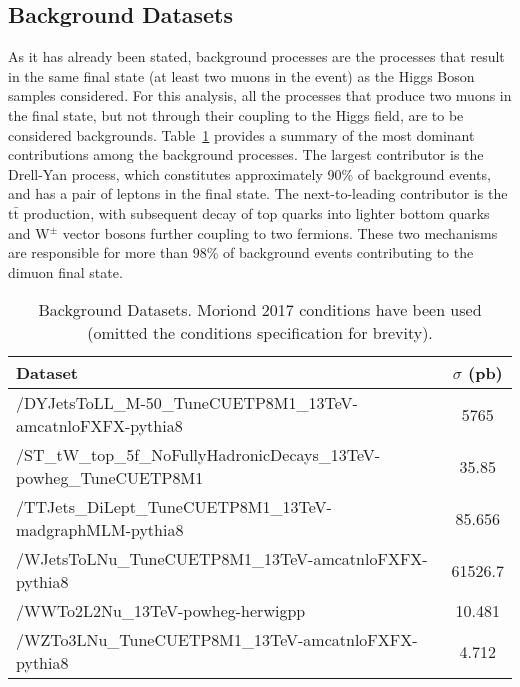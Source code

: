 \subsection{Background Datasets}
As it has already been stated, background processes are the processes that result in the same final state (at least two muons in the event) as the Higgs Boson samples considered. For this analysis, all the processes that produce two muons in the final state, but not through their coupling to the Higgs field,  are to be considered backgrounds. Table~\ref{table:higgs_data_backgrounddatasets} provides a summary of the most dominant contributions among the background processes. The largest contributor is the Drell-Yan process, which constitutes approximately 90\% of background events, and has a pair of leptons in the final state. The next-to-leading contributor is the $\mathrm{t\bar{t}}$ production, with subsequent decay of top quarks into lighter bottom quarks and W$^{\pm}$ vector bosons further coupling to two fermions. These two mechanisms are responsible for more than 98\% of background events contributing to the dimuon final state.
\begin{table}[htb]
    \caption{Background Datasets. Moriond 2017 conditions have been used (omitted the conditions specification for brevity).}
    \label{table:higgs_data_backgrounddatasets}
    \begin{center}
        \begin{tabular}{ l  c}
            \hline
            Dataset & $\sigma$ (pb)\\
            \hline
            /DYJetsToLL\_M-50\_TuneCUETP8M1\_13TeV-amcatnloFXFX-pythia8 & 5765\\
            /ST\_tW\_top\_5f\_NoFullyHadronicDecays\_13TeV-powheg\_TuneCUETP8M1 & 35.85\\
            /TTJets\_DiLept\_TuneCUETP8M1\_13TeV-madgraphMLM-pythia8 & 85.656\\
            /WJetsToLNu\_TuneCUETP8M1\_13TeV-amcatnloFXFX-pythia8 & 61526.7\\
            /WWTo2L2Nu\_13TeV-powheg-herwigpp & 10.481\\
            /WZTo3LNu\_TuneCUETP8M1\_13TeV-amcatnloFXFX-pythia8 & 4.712\\
            \hline
        \end{tabular}
    \end{center}
\end{table}

